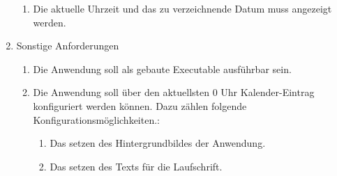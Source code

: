\begin{enumerate}[itemsep=0em,partopsep=0em,parsep=0em,topsep=0em]
\begin{enumerate}
	\item Die aktuelle Uhrzeit und das zu verzeichnende Datum muss angezeigt werden.
	\end{enumerate}
\item Sonstige Anforderungen
	\begin{enumerate}
	\item Die Anwendung soll als gebaute Executable ausführbar sein.
	\item Die Anwendung soll über den aktuellsten 0 Uhr Kalender-Eintrag konfiguriert werden können. Dazu zählen folgende Konfigurationsmöglichkeiten.:
	\begin{enumerate}
		\item Das setzen des Hintergrundbildes der Anwendung.
		\item Das setzen des Texts für die Laufschrift.
	\end{enumerate}
	\end{enumerate}
\end{enumerate}


